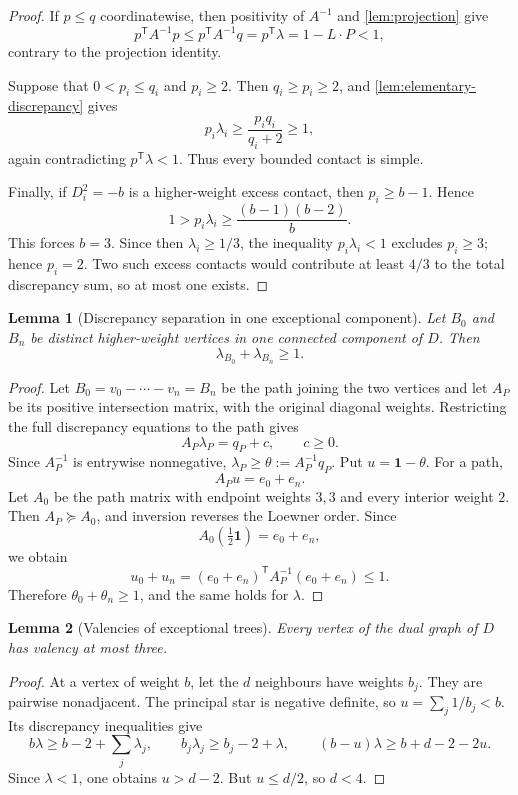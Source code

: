 \documentclass[11pt,reqno]{amsart}
\newtheorem{lemma}[lemma]{Lemma}
\theoremstyle{definition}
\theoremstyle{remark}
\numberwithin{equation}{section}
\begin{document}
\begin{proof}
If $p\le q$ coordinatewise, then positivity of $A^{-1}$ and \cref{lem:projection} give
\[
  p^{\mathsf T}A^{-1}p
  \le p^{\mathsf T}A^{-1}q
  =p^{\mathsf T}\lambda
  =1-L\cdot P<1,
\]
contrary to the projection identity.

Suppose that $0<p_i\le q_i$ and $p_i\ge2$.  Then $q_i\ge p_i\ge2$, and \cref{lem:elementary-discrepancy} gives
\[
  p_i\lambda_i
  \ge \frac{p_iq_i}{q_i+2}
  \ge1,
\]
again contradicting $p^{\mathsf T}\lambda<1$.  Thus every bounded contact is simple.

Finally, if $D_i^2=-b$ is a higher-weight excess contact, then $p_i\ge b-1$.  Hence
\[
  1>p_i\lambda_i
  \ge\frac{(b-1)(b-2)}{b}.
\]
This forces $b=3$.  Since then $\lambda_i\ge 1/3$, the inequality $p_i\lambda_i<1$ excludes $p_i\ge3$; hence $p_i=2$.  Two such excess contacts would contribute at least $4/3$ to the total discrepancy sum, so at most one exists.
\end{proof}

\begin{lemma}[Discrepancy separation in one exceptional component]
\label{lem:discrepancy-separation}
Let $B_0$ and $B_n$ be distinct higher-weight vertices in one connected component of $D$.
Then
\[
  \lambda_{B_0}+\lambda_{B_n}\geq1.
\]
\end{lemma}

\begin{proof}
Let $B_0=v_0-\cdots-v_n=B_n$ be the path joining the two vertices and let $A_P$ be
its positive intersection matrix, with the original diagonal weights.  Restricting the full
discrepancy equations to the path gives
\[
  A_P\lambda_P=q_P+c,\qquad c\geq0.
\]
Since $A_P^{-1}$ is entrywise nonnegative,
\(
  \lambda_P\geq\theta:=A_P^{-1}q_P.
\)
Put $u=\mathbf1-\theta$.  For a path,
\[
  A_Pu=e_0+e_n.
\]
Let $A_0$ be the path matrix with endpoint weights $3,3$ and every interior weight $2$.
Then $A_P\succeq A_0$, and inversion reverses the Loewner order.  Since
\[
 A_0\left(\tfrac12\mathbf1\right)=e_0+e_n,
\]
we obtain
\[
 u_0+u_n=(e_0+e_n)^{\mathsf T}A_P^{-1}(e_0+e_n)\leq1.
\]
Therefore $\theta_0+\theta_n\geq1$, and the same holds for $\lambda$.
\end{proof}

\begin{lemma}[Valencies of exceptional trees]\label{lem:exceptional-valency}
Every vertex of the dual graph of $D$ has valency at most three.
\end{lemma}
\begin{proof}
At a vertex of weight $b$, let the $d$ neighbours have weights $b_j$.
They are pairwise nonadjacent. The principal star is negative definite,
so $u=\sum_j1/b_j<b$. Its discrepancy inequalities give
\[
 b\lambda\ge b-2+\sum_j\lambda_j,\qquad
 b_j\lambda_j\ge b_j-2+\lambda,
 \qquad (b-u)\lambda\ge b+d-2-2u.
\]
Since $\lambda<1$, one obtains $u>d-2$. But $u\le d/2$, so $d<4$.
\end{proof}
\end{document}
